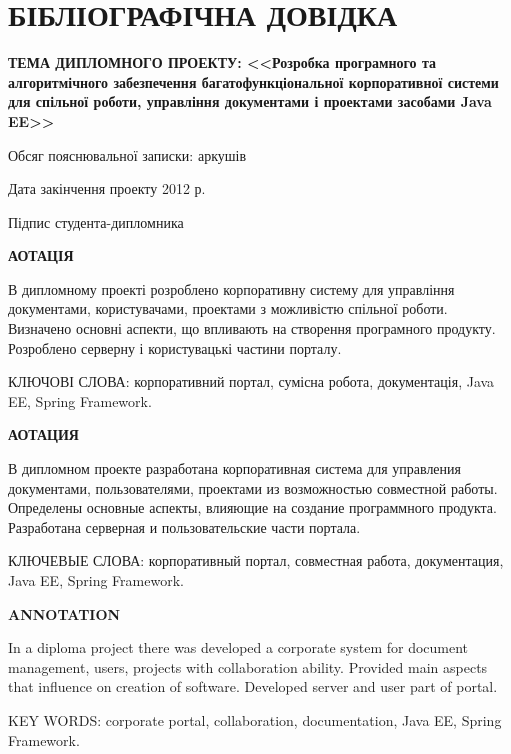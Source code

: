 \let\mycontinue\relax %

\section*{БІБЛІОГРАФІЧНА ДОВІДКА}
{\bf ТЕМА ДИПЛОМНОГО ПРОЕКТУ: <<Розробка програмного та алгоритмічного забезпечення багатофункціональної корпоративної системи для спільної роботи, управління документами і проектами засобами Java EE>>}
\vspace{30 mm}
\par Обсяг пояснювальної записки:\noindent\underline{} аркушів

\vspace{60 mm}

\par Дата закінчення проекту   \noindent\underline{} 2012 р.
\vspace{10 mm}
\par Підпис студента-дипломника \noindent\underline{\makebox[1.0in][c]{}}

\newpage
\begin{center}
\bf{АОТАЦІЯ}
\end{center}

\par В дипломному проекті розроблено корпоративну систему для управління документами, користувачами, проектами з можливістю спільної роботи. Визначено основні аспекти, що впливають на створення програмного продукту. Розроблено серверну і користувацькі частини порталу.
\vspace{10 mm}
\par КЛЮЧОВІ СЛОВА: корпоративний портал, сумісна робота, документація, Java EE, Spring Framework.

\newpage
\begin{center}
\bf{АОТАЦИЯ}
\end{center}

\par В дипломном проекте разработана корпоративная система для управления документами, пользователями, проектами из возможностью совместной работы. Определены основные аспекты, влияющие на создание программного продукта. Разработана серверная и пользовательские части портала.
\vspace{10 mm}
\par КЛЮЧЕВЫЕ СЛОВА: корпоративный портал, совместная работа, документация, Java EE, Spring Framework.


\newpage
\begin{center}
\bf{ANNOTATION}
\end{center}

\par In a diploma project there was developed a corporate system for document management, users, projects with collaboration ability. Provided main aspects that influence on creation of software. Developed server and user part of portal.
\vspace{10 mm}
\par KEY WORDS: corporate portal, collaboration, documentation, Java EE, Spring Framework.



